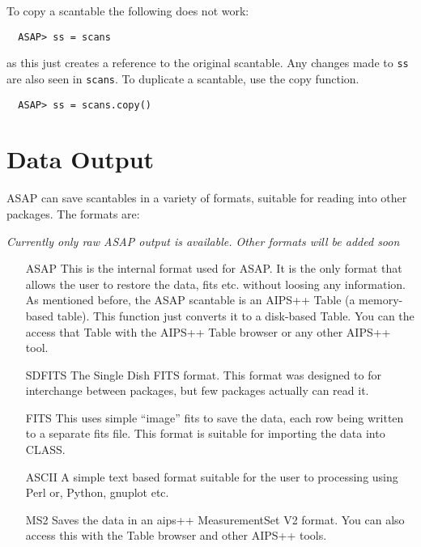 \documentclass[11pt]{article}
\newcommand{\cmd}[1]{{\tt #1}}
\begin{document}
To copy a scantable the following does not work:

\begin{verbatim}
  ASAP> ss = scans
\end{verbatim}

as this just creates a reference to the original scantable. Any
changes made to \cmd{ss} are also seen in \cmd{scans}. To duplicate a
scantable, use the copy function.

\begin{verbatim}
  ASAP> ss = scans.copy()
\end{verbatim}

\section{Data Output}

ASAP can save scantables in a
variety of formats, suitable for reading into other packages. The
formats are:

{\em Currently only raw ASAP output is available. Other formats will be added soon}

\begin{itemize}
\item[ASAP] This is the internal format used for ASAP. It is the only
  format that allows the user to restore the data, fits etc. without
  loosing any information.  As mentioned before, the ASAP scantable is
  an AIPS++ Table (a memory-based table).  This function just converts
  it to a disk-based Table.  You can the access that Table with the
  AIPS++ Table browser or any other AIPS++ tool.

\item[SDFITS] The Single Dish FITS format. This format was designed to
  for interchange between packages, but few packages actually can read
  it.

\item[FITS] This uses simple ``image'' fits to save the data, each row
  being written to a separate fits file. This format is suitable for
  importing the data into CLASS.

\item[ASCII] A simple text based format suitable for the user to
processing using Perl or, Python, gnuplot etc.

\item[MS2] Saves the data in an aips++ MeasurementSet V2 format.
You can also access this with the Table browser and other AIPS++
tools.

\end{itemize}
\end{document}
